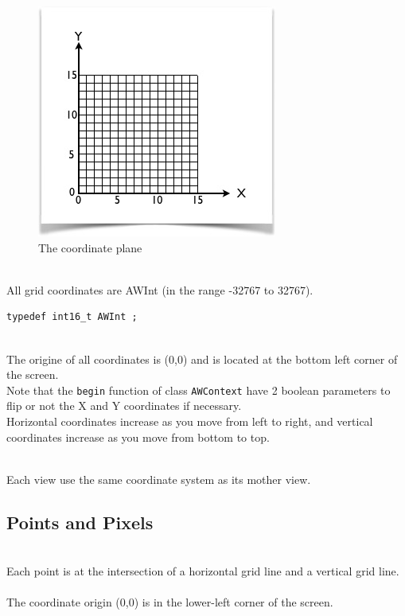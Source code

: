 \documentclass[a4paper,11pt]{extarticle}
\begin{document}
\begin{figure}[htbp]
   \centering
   \includegraphics[scale=1]{AWFig2.png} 
   \caption{The coordinate plane}
   \label{fig:2 }
\end{figure}

~\\All grid coordinates are AWInt (in the range -32767 to 32767).

\begin{lstlisting}[language=Arduinonl]
typedef int16_t AWInt ;
\end{lstlisting}

~\\The origine of all coordinates is (0,0) and is located at the bottom left corner of the screen.
~\\ Note that  the \texttt{begin} function of class \texttt{AWContext} have 2 boolean parameters to flip or not the X and Y coordinates if necessary.
~\\Horizontal coordinates increase as you move from left to right, and vertical coordinates increase as you move from bottom to top. 

~\\ Each view use the same coordinate system as its mother view. 



\newpage
\subsection{Points and Pixels}

~\\Each point is at the intersection of a horizontal grid line and a vertical grid line. 
~\\The coordinate origin (0,0) is in the lower-left corner of the screen. 
\end{document}
